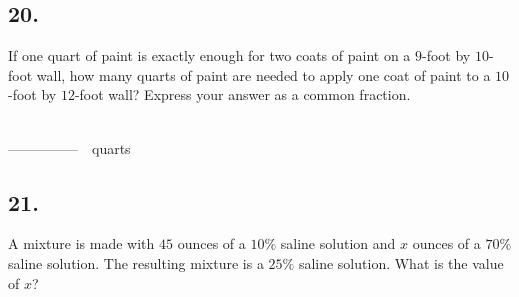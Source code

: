 \documentclass[12pt]{article}
\newenvironment{answer}{\vspace{1em}}{}
\newenvironment{answer}{\vspace{0em}\expandafter\comment}{\expandafter\endcomment}
\newlength{\currentparskip}
\newlength{\currentparindent}
\newenvironment{minipagex}[2][]
  {\setlength{\currentparskip}{\parskip}%
    \setlength{\currentparindent}{\parindent}%
   \begin{minipage}[#1]{#2}%
   \setlength{\parskip}{\currentparskip}%
   \setlength{\parindent}{\currentparindent}%
  }
  {\end{minipage}}
\begin{document}
\subsection*{20.}
If one quart of paint is exactly enough for two coats of paint on a $9$-foot by $10$-foot wall, how many quarts of paint are needed to apply one coat of paint to a $10$-foot by $12$-foot wall? Express your answer as a common fraction.

\fbox{\phantom{ANSWER}}\\
\mbox{---------------}~~quarts\\
\fbox{\phantom{ANSWER}}

\begin{answer}
%
\end{answer}


\subsection*{21.}
A mixture is made with $45$ ounces of a $10\%$ saline solution and $x$ ounces of a $70\%$ saline solution. The resulting mixture is a $25\%$ saline solution. What is the value of $x$? 

\fbox{\phantom{ANSWER}}
\end{document}
